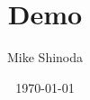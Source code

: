 \documentclass[UTF8,a4paper,twoside,12pt]{article}
\begin{document}
\title{\vspace{1.5cm}\bfseries{Demo}\vspace{1.5cm}}
\author{\vspace{1.5cm}Mike Shinoda\vspace{1.5cm}} %
\date{\today}

\maketitle

\newpage

\tableofcontents

\newpage


\end{document}
